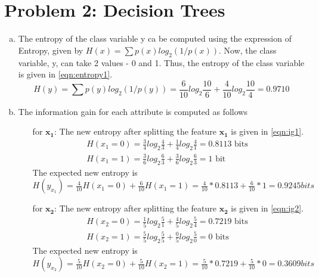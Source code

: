 \documentclass[a4paper, 11pt]{article}
\begin{document}
\pagebreak
\section*{Problem 2: Decision Trees}
\begin{enumerate}[(a)]
\item The entropy of the class variable y ca be computed using the expression of Entropy, given by $H(x) = \sum p(x) log_2(1/p(x))$. Now, the class variable, y, can take 2 values - 0 and 1. Thus, the entropy of the class variable is given in \autoref{eqn:entropy1}.
\begin{equation}
H(y) = \sum p(y) log_2(1/p(y))
= \frac{6}{10}log_2 \frac{10}{6} + \frac{4}{10}log_2 \frac{10}{4} = 0.9710
\label{eqn:entropy1}
\end{equation}

\item The information gain for each attribute is computed as follows
\begin{enumerate}
\item[for $\mathbf{x_1}$:] The new entropy after splitting the feature $\mathbf{x_1}$ is given in \autoref{eqn:ig1}.
\begin{equation}
\label{eqn:ig1}
\begin{split}
H(x_1 = 0) = \frac{3}{4}log_2 \frac{4}{3} + \frac{1}{4}log_2 \frac{4}{1} = 0.8113\text{ bits }\\
H(x_1 = 1) = \frac{3}{6}log_2 \frac{6}{3} + \frac{3}{6}log_2 \frac{6}{3} = 1\text{ bit }
\end{split}
\end{equation}
The expected new entropy is $H(y_{x_1}) = \frac{4}{10} H(x_1 = 0) + \frac{6}{10} H(x_1 = 1) = \frac{4}{10} * 0.8113 + \frac{6}{10} * 1 = 0.9245 bits $

\item[for $\mathbf{x_2}$:] The new entropy after splitting the feature $\mathbf{x_2}$ is given in \autoref{eqn:ig2}.
\begin{equation}
\begin{split}
H(x_2 = 0) = \frac{1}{5}log_2 \frac{5}{1} + \frac{4}{5}log_2 \frac{5}{4} = 0.7219\text{ bits }\\
H(x_2 = 1) = \frac{5}{5}log_2 \frac{5}{5} + \frac{0}{5}log_2 \frac{5}{0} = 0 \text{ bits }
\end{split}
\label{eqn:ig2}
\end{equation}
The expected new entropy is $H(y_{x_2}) = \frac{5}{10} H(x_2 = 0) + \frac{5}{10} H(x_2 = 1) = \frac{5}{10} * 0.7219 + \frac{5}{10} * 0 = 0.3609 bits $


\end{enumerate}
\end{enumerate}
\end{document}
